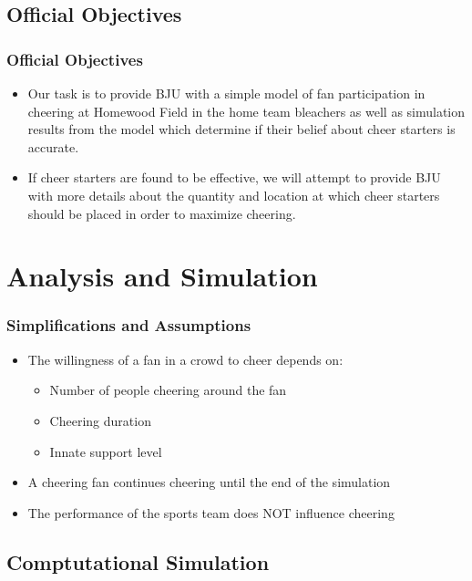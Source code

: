 \documentclass[compress,handout,10pt]{beamer}
\let\olditem\item
\renewcommand{\item}{\setlength{\itemsep}{0.5\baselineskip}\olditem}
\begin{document}
\subsection{Official Objectives}

\begin{frame}
	\frametitle {Official Objectives}
	\begin {itemize}
		\item Our task is to provide BJU with a simple model of fan participation in cheering at Homewood Field in the home team bleachers as well as simulation results from the model which determine if their belief about cheer starters is accurate.
		\item If cheer starters are found to be effective, we will attempt to provide BJU with more details about the quantity and location at which cheer starters should be placed in order to maximize cheering.
		\end {itemize}
\end{frame}

\section{Analysis and Simulation}
\begin{frame}
\frametitle{Simplifications and Assumptions}
\begin{itemize}
	\item The willingness of a fan in a crowd to cheer depends on:
	\begin{itemize}
	 	\item Number of people cheering around the fan
	 	\item Cheering duration
	 	\item Innate support level
	\end{itemize}
	\item A cheering fan continues cheering until the end of the simulation
	\item The performance of the sports team does NOT influence cheering
	\end{itemize}
\end{frame}

\subsection{Comptutational Simulation}
\end{document}
